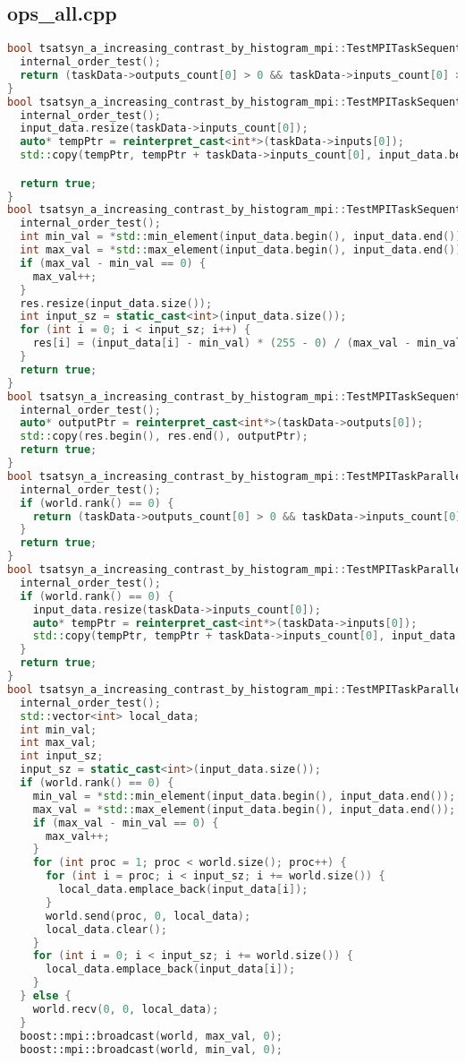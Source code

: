 \documentclass[a4paper,12pt]{article}
\begin{document}
\subsection{ops\_all.cpp}
\begin{lstlisting}[language=C++,
    breaklines=true,       % Автоматический перенос строк
    basicstyle=\small\ttfamily, % Уменьшенный шрифт
    columns=fullflexible ]
bool tsatsyn_a_increasing_contrast_by_histogram_mpi::TestMPITaskSequential::validation() {
  internal_order_test();
  return (taskData->outputs_count[0] > 0 && taskData->inputs_count[0] > 0);
}
bool tsatsyn_a_increasing_contrast_by_histogram_mpi::TestMPITaskSequential::pre_processing() {
  internal_order_test();
  input_data.resize(taskData->inputs_count[0]);
  auto* tempPtr = reinterpret_cast<int*>(taskData->inputs[0]);
  std::copy(tempPtr, tempPtr + taskData->inputs_count[0], input_data.begin());

  return true;
}
bool tsatsyn_a_increasing_contrast_by_histogram_mpi::TestMPITaskSequential::run() {
  internal_order_test();
  int min_val = *std::min_element(input_data.begin(), input_data.end());
  int max_val = *std::max_element(input_data.begin(), input_data.end());
  if (max_val - min_val == 0) {
    max_val++;
  }
  res.resize(input_data.size());
  int input_sz = static_cast<int>(input_data.size());
  for (int i = 0; i < input_sz; i++) {
    res[i] = (input_data[i] - min_val) * (255 - 0) / (max_val - min_val) + 0;
  }
  return true;
}
bool tsatsyn_a_increasing_contrast_by_histogram_mpi::TestMPITaskSequential::post_processing() {
  internal_order_test();
  auto* outputPtr = reinterpret_cast<int*>(taskData->outputs[0]);
  std::copy(res.begin(), res.end(), outputPtr);
  return true;
}
bool tsatsyn_a_increasing_contrast_by_histogram_mpi::TestMPITaskParallel::validation() {
  internal_order_test();
  if (world.rank() == 0) {
    return (taskData->outputs_count[0] > 0 && taskData->inputs_count[0] > 0);
  }
  return true;
}
bool tsatsyn_a_increasing_contrast_by_histogram_mpi::TestMPITaskParallel::pre_processing() {
  internal_order_test();
  if (world.rank() == 0) {
    input_data.resize(taskData->inputs_count[0]);
    auto* tempPtr = reinterpret_cast<int*>(taskData->inputs[0]);
    std::copy(tempPtr, tempPtr + taskData->inputs_count[0], input_data.begin());
  }
  return true;
}
bool tsatsyn_a_increasing_contrast_by_histogram_mpi::TestMPITaskParallel::run() {
  internal_order_test();
  std::vector<int> local_data;
  int min_val;
  int max_val;
  int input_sz;
  input_sz = static_cast<int>(input_data.size());
  if (world.rank() == 0) {
    min_val = *std::min_element(input_data.begin(), input_data.end());
    max_val = *std::max_element(input_data.begin(), input_data.end());
    if (max_val - min_val == 0) {
      max_val++;
    }
    for (int proc = 1; proc < world.size(); proc++) {
      for (int i = proc; i < input_sz; i += world.size()) {
        local_data.emplace_back(input_data[i]);
      }
      world.send(proc, 0, local_data);
      local_data.clear();
    }
    for (int i = 0; i < input_sz; i += world.size()) {
      local_data.emplace_back(input_data[i]);
    }
  } else {
    world.recv(0, 0, local_data);
  }
  boost::mpi::broadcast(world, max_val, 0);
  boost::mpi::broadcast(world, min_val, 0);


\end{lstlisting}
\end{document}
